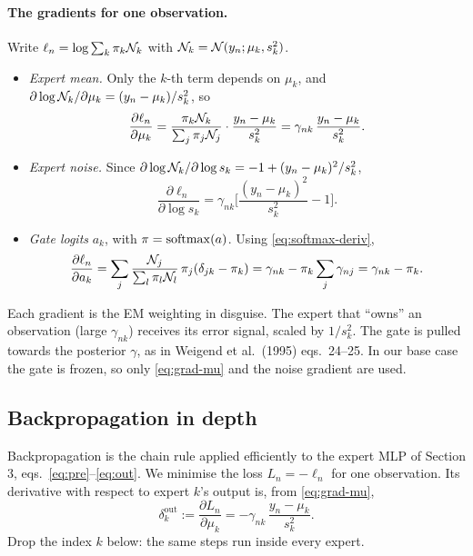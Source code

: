 \paragraph{The gradients for one observation.} Write $\ell_n=\log\sum_k\pi_k\mathcal{N}_k$ with $\mathcal{N}_k=\mathcal{N}(y_n;\mu_k,s_k^2)$.
\begin{itemize}
  \item \emph{Expert mean.} Only the $k$-th term depends on $\mu_k$, and $\partial\log\mathcal{N}_k/\partial\mu_k=(y_n-\mu_k)/s_k^2$, so
  \begin{equation}\label{eq:grad-mu}
  \frac{\partial\ell_n}{\partial\mu_k}=\frac{\pi_k\mathcal{N}_k}{\sum_j\pi_j\mathcal{N}_j}\cdot\frac{y_n-\mu_k}{s_k^2}=\gamma_{nk}\,\frac{y_n-\mu_k}{s_k^2}.
  \end{equation}
  \item \emph{Expert noise.} Since $\partial\log\mathcal{N}_k/\partial\log s_k=-1+(y_n-\mu_k)^2/s_k^2$,
  \begin{equation}
  \frac{\partial\ell_n}{\partial\log s_k}=\gamma_{nk}\Big[\frac{(y_n-\mu_k)^2}{s_k^2}-1\Big].
  \end{equation}
  \item \emph{Gate logits} $a_k$, with $\pi=\operatorname{softmax}(a)$. Using \eqref{eq:softmax-deriv},
  \begin{equation}
  \frac{\partial\ell_n}{\partial a_k}=\sum_j\frac{\mathcal{N}_j}{\sum_l\pi_l\mathcal{N}_l}\,\pi_j(\delta_{jk}-\pi_k)=\gamma_{nk}-\pi_k\sum_j\gamma_{nj}=\gamma_{nk}-\pi_k.
  \end{equation}
\end{itemize}
Each gradient is the EM weighting in disguise. The expert that ``owns'' an observation (large $\gamma_{nk}$) receives its error signal, scaled by $1/s_k^2$. The gate is pulled towards the posterior $\gamma$, as in Weigend et al.\ (1995) eqs.~24--25. In our base case the gate is frozen, so only \eqref{eq:grad-mu} and the noise gradient are used.

\subsection{Backpropagation in depth}

Backpropagation is the chain rule applied efficiently to the expert MLP of Section 3, eqs.~\eqref{eq:pre}--\eqref{eq:out}. We minimise the loss $L_n=-\ell_n$ for one observation. Its derivative with respect to expert $k$'s output is, from \eqref{eq:grad-mu},
\begin{equation}
\delta^{\text{out}}_k:=\frac{\partial L_n}{\partial\mu_k}=-\gamma_{nk}\,\frac{y_n-\mu_k}{s_k^2}.
\end{equation}
Drop the index $k$ below: the same steps run inside every expert.

